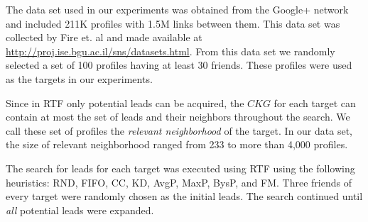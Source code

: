 \documentclass[journal]{IEEEtran}
\begin{document}
The data set used in our experiments was obtained from the Google+ network and included 211K profiles with 1.5M links between them. This data set was collected by Fire et. al \cite{fire2011linkPrediction} and made available at \url{http://proj.ise.bgu.ac.il/sns/datasets.html}. From this data set we randomly selected  a set of 100 profiles having at least 30 friends. These profiles were used as the targets in our experiments. 


Since in RTF only potential leads can be acquired, the $CKG$ for each target can contain at most the set of leads and their neighbors throughout the search. We call these set of profiles the {\em relevant neighborhood} of the target. In our data set, the size of relevant neighborhood ranged from 233 to more than 4,000 profiles. 

The search for leads for each target was executed using RTF using the following heuristics: RND, FIFO, CC, KD, AvgP, MaxP, BysP, and FM. Three friends of every target were randomly chosen as the initial leads. The search continued until {\em all} potential leads were expanded.

 
\end{document}
